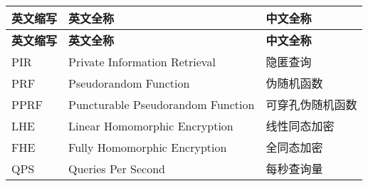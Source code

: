 \cleardoublepage
{}
\begin{center}
    \begin{longtable}{m{2cm}m{8cm}m{5cm}}
        \toprule
        \textbf{英文缩写}&\textbf{英文全称}&\textbf{中文全称}\\
        \midrule
        \endfirsthead
        \toprule
        \textbf{英文缩写}&\textbf{英文全称}&\textbf{中文全称}\\
        \midrule
        \endhead 
        \bottomrule
        \endfoot
        \bottomrule
        \endlastfoot
        PIR&Private Information Retrieval&隐匿查询\\
        PRF&Pseudorandom Function&伪随机函数\\
        PPRF&Puncturable Pseudorandom Function&可穿孔伪随机函数\\
        LHE&Linear Homomorphic Encryption&线性同态加密\\
        FHE&Fully Homomorphic Encryption&全同态加密\\
        QPS&Queries Per Second&每秒查询量\\
	\end{longtable}
\end{center}